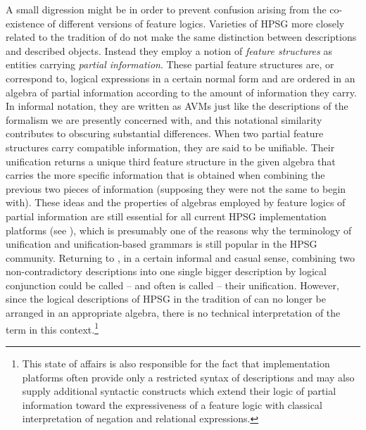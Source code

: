 \documentclass[output=paper
 	        ,biblatex
                ,babelshorthands
                ,newtxmath
                ,draftmode
                ,colorlinks, citecolor=brown
]{langscibook}
\begin{document}
A small digression might be in order to prevent confusion arising from
the co-existence of different versions of feature logics.  Varieties
of HPSG more closely related to the tradition of 
do not make the same distinction between descriptions and described
objects. Instead they employ a notion of \emph{feature structures} as
entities carrying \emph{partial information}. These partial feature
structures are, or correspond to, logical expressions in a certain
normal form and are ordered in an algebra of partial information
according to the amount of information they carry. In informal
notation, they are written as AVMs just like the descriptions of the
formalism we are presently concerned with, and this notational
similarity contributes to obscuring substantial differences.  When two
partial feature structures carry compatible information, they are said
to be unifiable. Their unification returns a unique third feature
structure in the given algebra that carries the more specific
information that is obtained when combining the previous two pieces of
information (supposing they were not the same to begin with). These ideas and the
properties of algebras employed by feature logics of partial information are
still essential for all current HPSG implementation platforms (see ), which
is presumably one of the reasons why the terminology of unification
and unification-based grammars is still popular in the HPSG
community. Returning to , in a certain
informal and casual sense, combining two non-contradictory descriptions
into one single bigger description by logical conjunction could be
called -- and often is called -- their unification. However, since the
logical descriptions of HPSG in the tradition of 
can no longer be arranged in an appropriate algebra, there is no
technical interpretation of the term in this context.\footnote{This
  state of affairs is also responsible for the fact that
  implementation platforms often provide only a restricted syntax of
  descriptions and may also supply additional syntactic constructs which
  extend their logic of partial information toward the expressiveness of
  a feature logic with classical interpretation of negation and
  relational expressions.}
\end{document}
